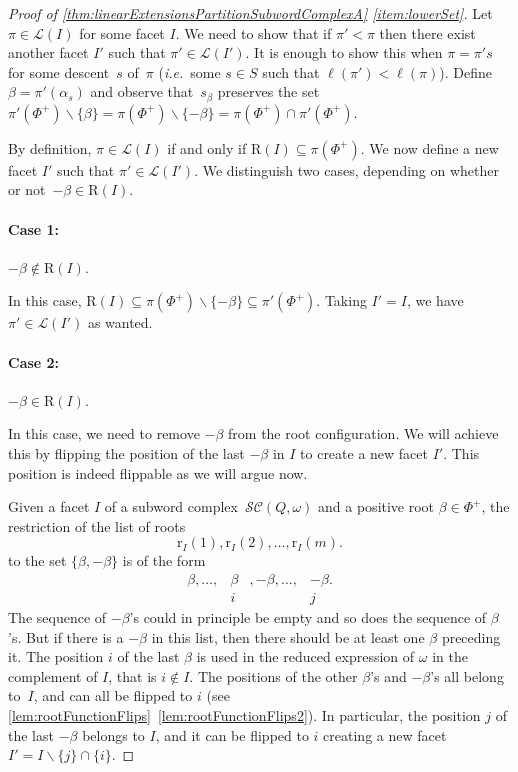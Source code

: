 \documentclass[reqno]{amsart}
\theoremstyle{definition}
\newcommand{\ssm}{\smallsetminus} %
\newcommand{\ie}{\textit{i.e.}~} %
\newcommand{\linearExtensions}{\mathcal{L}} %
\newcommand{\subwordComplex}{\mathcal{SC}} %
\newcommand{\Roots}{\mathrm{R}} %
\newcommand{\rootFunction}[2]{\mathrm{r}_{#1}(#2)} %
\begin{document}
\begin{proof}[Proof of \cref{thm:linearExtensionsPartitionSubwordComplexA} \eqref{item:lowerSet}]
Let $\pi \in \linearExtensions(I)$ for some facet $I$.
We need to show that if $\pi' < \pi$ then there exist another facet $I'$ such that $\pi' \in \linearExtensions(I')$.
It is enough to show this when $\pi = \pi's$ for some descent~$s$ of~$\pi$ (\ie some $s\in S$ such that $\ell(\pi') < \ell(\pi)$).
Define~$\beta=\pi'(\alpha_s)$ and observe that~$s_\beta$ preserves the set~$\pi'(\Phi^+) \ssm \{\beta\} = \pi(\Phi^+) \ssm \{-\beta\} = \pi(\Phi^+) \cap \pi'(\Phi^+)$.

By definition, $\pi \in \linearExtensions(I)$ if and only if $\Roots(I) \subseteq \pi(\Phi^+)$.
We now define a new facet $I'$ such that $\pi' \in \linearExtensions(I')$.
We distinguish two cases, depending on whether or not~$-\beta \in \Roots(I)$.

\medskip
\paragraph{\bf Case 1:} $-\beta \notin \Roots(I)$.

In this case, 
$\Roots(I)\subseteq \pi(\Phi^+) \ssm \{-\beta\} \subseteq \pi'(\Phi^+)$.
Taking $I'=I$, we have 
$\pi'\in \linearExtensions(I')$ 
as wanted.

\medskip
\paragraph{\bf Case 2:} $-\beta \in \Roots(I)$.

In this case, we need to remove $-\beta$ from the root configuration.
We will achieve this by flipping the position of the last $-\beta$ in $I$ to create a new facet $I'$.
This position is indeed flippable as we will argue now. 

Given a facet $I$ of a subword complex~$\subwordComplex(Q,\omega)$ and a positive root $\beta\in \Phi^+$, the restriction of the list of roots 
\[
\rootFunction{I}{1}, \rootFunction{I}{2}, \dots , \rootFunction{I}{m}.
\]
to the set $\{\beta,-\beta\}$ is of the form
\[
\begin{array}{cccc}
\beta, \dots , & \beta &, -\beta, \dots, &-\beta.\\
& i && j
\end{array}
\]
The sequence of $-\beta$'s could in principle be empty and so does the sequence of $\beta$'s.
But if there is a $-\beta$ in this list, then there should be at least one $\beta$ preceding it.
The position $i$ of the last $\beta$ is used in the reduced expression of $\omega$ in the complement of $I$, that is $i\notin I$.
The positions of the other $\beta$'s and $-\beta$'s all belong to~$I$, and can all be flipped to $i$ (see \cref{lem:rootFunctionFlips}~\eqref{lem:rootFunctionFlips2}).   
In particular, the position $j$ of the last $-\beta$ belongs to $I$, and it can be flipped to $i$ creating a new facet $I'=I\ssm \{j\} \cap \{i\}$.


\end{proof}
\end{document}
